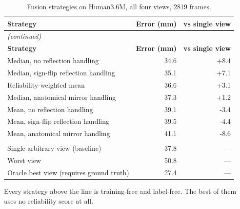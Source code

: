 \vspace{0.6cm}

\begin{center}
{\fontsize{10}{12}\selectfont
\begin{longtable}{lrr}
\caption{Fusion strategies on Human3.6M, all four views, 2819 frames.}\label{tab:appfusionstrat}\\
\hline
\textbf{Strategy} & \textbf{Error (mm)} & \textbf{vs single view} \\
\hline
\endfirsthead
\multicolumn{3}{l}{\textit{(continued)}}\\
\hline
\textbf{Strategy} & \textbf{Error (mm)} & \textbf{vs single view} \\
\hline
\endhead
\hline
\endfoot
Median, no reflection handling & 34.6 & +8.4 \\
Median, sign-flip reflection handling & 35.1 & +7.1 \\
Reliability-weighted mean & 36.6 & +3.1 \\
Median, anatomical mirror handling & 37.3 & +1.2 \\
Mean, no reflection handling & 39.1 & -3.4 \\
Mean, sign-flip reflection handling & 39.5 & -4.4 \\
Mean, anatomical mirror handling & 41.1 & -8.6 \\
\hline \\
Single arbitrary view (baseline) & 37.8 & --- \\
Worst view & 50.8 & --- \\
Oracle best view (requires ground truth) & 27.4 & --- \\
\end{longtable}
}
\end{center}
\noindent Every strategy above the line is training-free and label-free. The best of them uses no reliability score at all.

\vspace{0.6cm}

